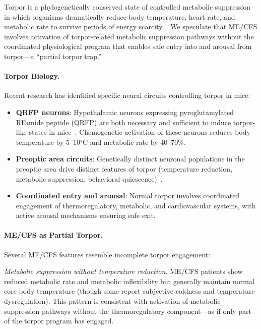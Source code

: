 \begin{speculation}
\label{spec:partial-torpor}

Torpor is a phylogenetically conserved state of controlled metabolic suppression in which organisms dramatically reduce body temperature, heart rate, and metabolic rate to survive periods of energy scarcity~\cite{Hrvatin2020torpor,Takahashi2020torpor}. We speculate that ME/CFS involves activation of torpor-related metabolic suppression pathways without the coordinated physiological program that enables safe entry into and arousal from torpor---a ``partial torpor trap.''

\paragraph{Torpor Biology.}
Recent research has identified specific neural circuits controlling torpor in mice:

\begin{itemize}
    \item \textbf{QRFP neurons}: Hypothalamic neurons expressing pyroglutamylated RFamide peptide (QRFP) are both necessary and sufficient to induce torpor-like states in mice~\cite{Takahashi2020torpor}. Chemogenetic activation of these neurons reduces body temperature by 5--10$^\circ$C and metabolic rate by 40--70\%.
    \item \textbf{Preoptic area circuits}: Genetically distinct neuronal populations in the preoptic area drive distinct features of torpor (temperature reduction, metabolic suppression, behavioral quiescence)~\cite{Hrvatin2020torpor}.
    \item \textbf{Coordinated entry and arousal}: Normal torpor involves coordinated engagement of thermoregulatory, metabolic, and cardiovascular systems, with active arousal mechanisms ensuring safe exit.
\end{itemize}

\paragraph{ME/CFS as Partial Torpor.}
Several ME/CFS features resemble incomplete torpor engagement:

\textit{Metabolic suppression without temperature reduction.} ME/CFS patients show reduced metabolic rate and metabolic inflexibility but generally maintain normal core body temperature (though some report subjective coldness and temperature dysregulation). This pattern is consistent with activation of metabolic suppression pathways without the thermoregulatory component---as if only part of the torpor program has engaged.


\end{speculation}
